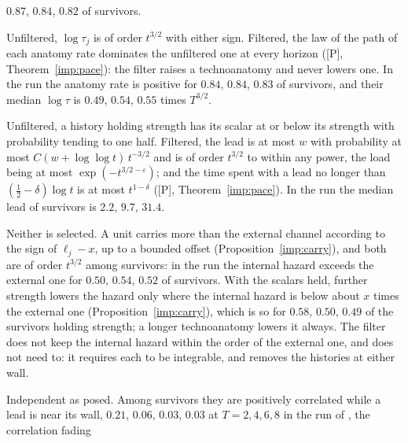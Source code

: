 \begin{description}
$0.87$, $0.84$, $0.82$ of survivors.
\item[The scalars and their rates.] Unfiltered, $\log\tau_j$ is of order
$t^{3/2}$ with either sign. Filtered, the law of the path of each anatomy
rate dominates the unfiltered one at every horizon ([P], Theorem~\ref{imp:pace}): the
filter raises a technoanatomy and never lowers one. In the run the
anatomy rate is positive for $0.84$, $0.84$, $0.83$ of
survivors, and their median $\log\tau$ is $0.49$, $0.54$, $0.55$
times $T^{3/2}$.
\item[The leads and the loads.] Unfiltered, a history holding strength
has its scalar at or below its strength with probability tending to one
half. Filtered, the lead is at most $w$ with probability at most
$C(w+\log\log t)\,t^{-3/2}$ and is of order $t^{3/2}$ to within any power,
the load being at most $\exp(-t^{3/2-\varepsilon})$; and the time spent
with a lead no longer than $(\tfrac12-\delta)\log t$ is at most
$t^{1-\delta}$ ([P], Theorem~\ref{imp:pace}). In the run the median lead of survivors is
$2.2$, $9.7$, $31.4$.
\item[Which channel carries the hazard.] Neither is selected. A unit
carries more than the external channel according to the sign of
$\ell_j-x$, up to a bounded offset (Proposition~\ref{imp:carry}), and both are of order
$t^{3/2}$ among survivors: in the run the internal hazard exceeds the
external one for $0.50$, $0.54$, $0.52$ of survivors. With
the scalars held, further strength lowers the hazard only where the
internal hazard is below about $x$ times the external one (Proposition~\ref{imp:carry}),
which is so for $0.58$, $0.50$, $0.49$ of the survivors holding
strength; a longer technoanatomy lowers it always. The filter does not
keep the internal hazard within the order of the external one, and does
not need to: it requires each to be integrable, and removes the histories
at either wall.
\item[The two rates together.] Independent as posed. Among survivors
they are positively correlated while a lead is near its wall, $0.21$,
$0.06$, $0.03$, $0.03$ at $T=2,4,6,8$ in the run of \cite{GoldenSurvivorship}, the correlation fading

\end{description}
